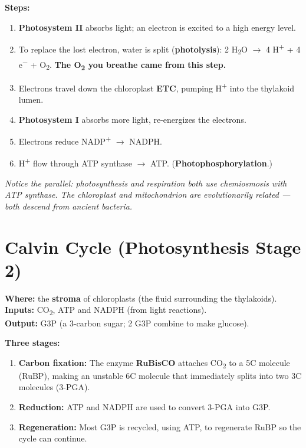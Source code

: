 \documentclass[11pt, letterpaper]{article}
\begin{document}
\textbf{Steps:}
\begin{enumerate}[noitemsep]
  \item \textbf{Photosystem II} absorbs light; an electron is excited to a high energy level.
  \item To replace the lost electron, water is split (\textbf{photolysis}): 2 H\textsubscript{2}O $\to$ 4 H\textsuperscript{+} + 4 e\textsuperscript{$-$} + O\textsubscript{2}. \textbf{The O\textsubscript{2} you breathe came from this step.}
  \item Electrons travel down the chloroplast \textbf{ETC}, pumping H\textsuperscript{+} into the thylakoid lumen.
  \item \textbf{Photosystem I} absorbs more light, re-energizes the electrons.
  \item Electrons reduce NADP\textsuperscript{+} $\to$ NADPH.
  \item H\textsuperscript{+} flow through ATP synthase $\to$ ATP. (\textbf{Photophosphorylation}.)
\end{enumerate}

\textit{Notice the parallel: photosynthesis and respiration both use chemiosmosis with ATP synthase. The chloroplast and mitochondrion are evolutionarily related --- both descend from ancient bacteria.}

\section*{Calvin Cycle (Photosynthesis Stage 2)}

\textbf{Where:} the \textbf{stroma} of chloroplasts (the fluid surrounding the thylakoids).\\
\textbf{Inputs:} CO\textsubscript{2}, ATP and NADPH (from light reactions).\\
\textbf{Output:} G3P (a 3-carbon sugar; 2 G3P combine to make glucose).

\textbf{Three stages:}
\begin{enumerate}[noitemsep]
  \item \textbf{Carbon fixation:} The enzyme \textbf{RuBisCO} attaches CO\textsubscript{2} to a 5C molecule (RuBP), making an unstable 6C molecule that immediately splits into two 3C molecules (3-PGA).
  \item \textbf{Reduction:} ATP and NADPH are used to convert 3-PGA into G3P.
  \item \textbf{Regeneration:} Most G3P is recycled, using ATP, to regenerate RuBP so the cycle can continue.
\end{enumerate}
\end{document}
